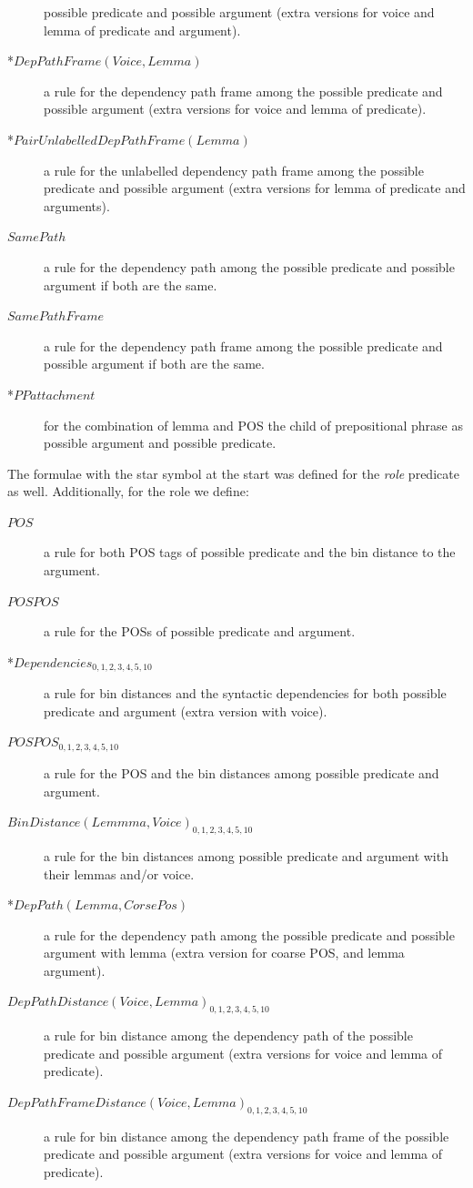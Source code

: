 \begin{description}
        possible predicate and possible argument (extra versions for voice and
        lemma of predicate and argument).
    \item[*$DepPathFrame(Voice,Lemma)$] a rule for the dependency path frame among the
        possible predicate and possible argument (extra versions for voice and
        lemma of predicate).
    \item[*$PairUnlabelledDepPathFrame(Lemma)$] a rule for the unlabelled dependency path frame among the
        possible predicate and possible argument (extra versions for lemma of
        predicate and arguments).
    \item[$SamePath$] a rule for the dependency path among the
        possible predicate and possible argument if both are the same.
    \item[$SamePathFrame$] a rule for the dependency path frame among the
        possible predicate and possible argument if both are the same.
    \item[*$PPattachment$] for the combination of lemma and POS the child of prepositional phrase as possible argument and possible predicate.
\end{description}
The formulae with the star symbol at the start was defined for the \emph{role}
predicate as well. Additionally, for the role we define:
\begin{description}
    \item[$POS$] a rule for both POS tags of possible predicate and the bin
        distance to the argument.
    \item[$POSPOS$] a rule for the POSs of possible predicate and argument.
    \item[*$Dependencies_{0,1,2,3,4,5,10}$] a rule for bin distances and the syntactic dependencies for both possible predicate and
        argument (extra version with voice).
    \item[$POSPOS_{0,1,2,3,4,5,10}$] a rule for the POS and the bin distances among  possible predicate and argument.
    \item[$BinDistance(Lemmma,Voice)_{0,1,2,3,4,5,10}$] a rule for the bin distances among possible predicate and argument with their lemmas and/or voice.
    \item[*$DepPath(Lemma,CorsePos)$] a rule for the dependency path among the
        possible predicate and possible argument with lemma (extra version for coarse POS, and lemma argument).
    \item[$DepPathDistance(Voice,Lemma)_{0,1,2,3,4,5,10}$] a rule for bin distance among the dependency path of the
        possible predicate and possible argument (extra versions for voice and
        lemma of predicate).
    \item[$DepPathFrameDistance(Voice,Lemma)_{0,1,2,3,4,5,10}$] a rule for bin distance among the dependency path frame of the
        possible predicate and possible argument (extra versions for voice and
        lemma of predicate).
\end{description}

